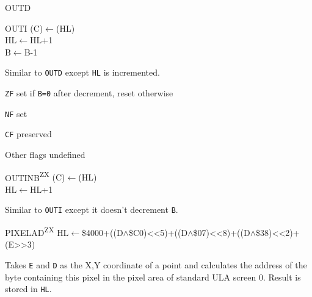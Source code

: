 \documentclass[twoside,openright,a4paper]{book}
\newcommand{\ZXN}{\textnormal{\textsuperscript{ZX}}}
\begin{document}
\begin{basedescript}{
	\desclabelstyle{\multilinelabel}
	\desclabelwidth{3cm}}
\begin{detailitem}{OUTD}
		\begin{DetailTiming}
		\end{DetailTiming}

	\end{detailitem}
	
	\pagebreak	%

	\begin{detailitem}{OUTI}
		{(C)$\leftarrow$(HL)\\
		HL$\leftarrow$HL+1\\
		B$\leftarrow$B-1}

		Similar to {\tt OUTD} except {\tt HL} is incremented.
		
		\begin{DetailEffects}
			\item {\tt ZF} set if {\tt B=0} after decrement, reset otherwise
			\item {\tt NF} set
			\item {\tt CF} preserved
			\item Other flags undefined
		\end{DetailEffects}
				
		\begin{DetailTiming}
			\DetailTime{}{4}{16}
		\end{DetailTiming}

	\end{detailitem}

	\begin{detailitem}{OUTINB\ZXN}
		{(C)$\leftarrow$(HL)\\
		HL$\leftarrow$HL+1}

		Similar to {\tt OUTI} except it doesn't decrement {\tt B}.

		\DetailUndefinedEffects
				
		\begin{DetailTiming}
		\end{DetailTiming}

	\end{detailitem}

	\begin{detailitem}{PIXELAD\ZXN}
		{HL$\leftarrow$\$4000+((D$\wedge$\$C0)<<5)+((D$\wedge$\$07)<<8)+((D$\wedge$\$38)<<2)+(E>>3)}

		Takes {\tt E} and {\tt D} as the X,Y coordinate of a point and calculates the address of the byte containing this pixel in the pixel area of standard ULA screen 0. Result is stored in {\tt HL}.


\end{detailitem}
\end{basedescript}
\end{document}
